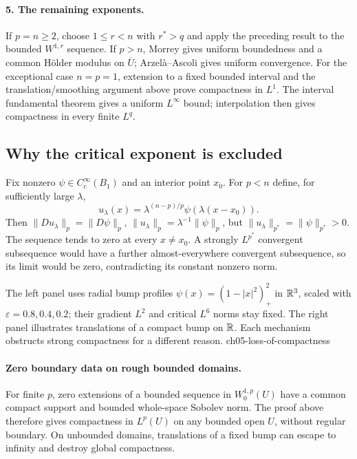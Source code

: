 \begin{expandedproof}
\paragraph{5. The remaining exponents.}
If $p=n\geq2$, choose $1\leq r<n$ with $r^*>q$ and apply the preceding
result to the bounded $W^{1,r}$ sequence. If $p>n$, Morrey gives
uniform boundedness and a common H\"older modulus on $\overline U$;
Arzel\`a--Ascoli gives uniform convergence.
For the exceptional case $n=p=1$, extension to a fixed bounded interval
and the translation/smoothing argument above prove compactness in $L^1$.
The interval fundamental theorem gives a uniform $L^\infty$ bound;
interpolation then gives compactness in every finite $L^q$.
\end{expandedproof}
\Needspace{45mm}

\subsection{Why the critical exponent is excluded}
Fix nonzero $\psi\in C_c^\infty(B_1)$ and an interior point $x_0$.
For $p<n$ define, for sufficiently large $\lambda$,
\[
 u_\lambda(x)=\lambda^{(n-p)/p}\psi(\lambda(x-x_0)).
\]
Then $\|Du_\lambda\|_p=\|D\psi\|_p$,
$\|u_\lambda\|_p=\lambda^{-1}\|\psi\|_p$, but
$\|u_\lambda\|_{p^*}=\|\psi\|_{p^*}>0$.
The sequence tends to zero at every $x\ne x_0$.
A strongly $L^{p^*}$ convergent subsequence would have a further
almost-everywhere convergent subsequence, so its limit would be zero,
contradicting its constant nonzero norm.
\Needspace{45mm}


{The left panel uses radial bump profiles $\psi(x)=(1-|x|^2)_+^2$ in $\mathbb{R}^3$, scaled with $\varepsilon=0.8,0.4,0.2$; their gradient $L^2$ and critical $L^6$ norms stay fixed. The right panel illustrates translations of a compact bump on $\mathbb{R}$. Each mechanism obstructs strong compactness for a different reason.}
{ch05-loss-of-compactness}

\paragraph{Zero boundary data on rough bounded domains.}
For finite $p$, zero extensions of a bounded sequence in $W^{1,p}_0(U)$
have a common compact support and bounded whole-space Sobolev norm.
The proof above therefore gives compactness in $L^p(U)$ on any bounded
open $U$, without regular boundary. On unbounded domains, translations
of a fixed bump can escape to infinity and destroy global compactness.
